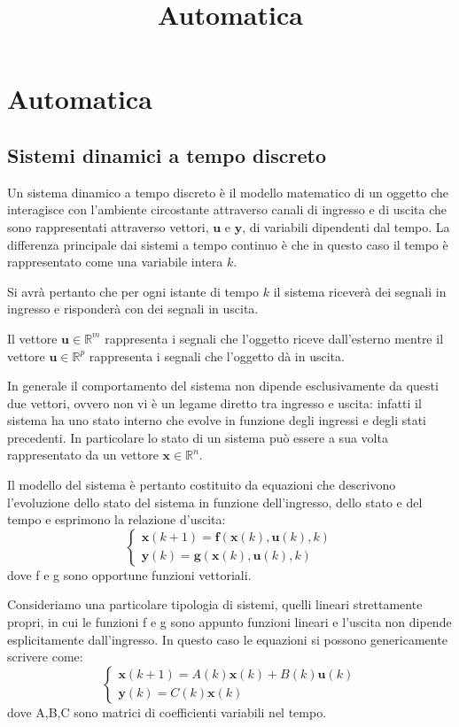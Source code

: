 \documentclass[12pt,a4paper]{article}
\title{Automatica}
\begin{document}
\section{Automatica}
\subsection{Sistemi dinamici a tempo discreto}

Un sistema dinamico a tempo discreto è il modello matematico di un oggetto che interagisce con l’ambiente circostante attraverso canali di ingresso e di uscita che sono rappresentati attraverso vettori, $\mathbf{u}$ e $\mathbf{y}$, di variabili dipendenti dal tempo. La differenza principale dai sistemi a tempo continuo è che in questo caso il tempo è rappresentato come una variabile intera $k$.

Si avrà pertanto che per ogni istante di tempo $k$ il sistema riceverà dei segnali in ingresso e risponderà con dei segnali in uscita.

Il vettore $\mathbf{u} \in \mathbb{R}^m$ rappresenta i segnali che l’oggetto riceve dall’esterno mentre il vettore $\mathbf{u} \in \mathbb{R}^p$ rappresenta i segnali che l’oggetto dà in uscita.


In generale il comportamento del sistema non dipende esclusivamente da questi due vettori, ovvero non vi è un legame diretto tra ingresso e uscita: infatti il sistema ha uno stato interno che evolve in funzione degli ingressi e degli stati precedenti. In particolare lo stato di un sistema può essere a sua volta rappresentato da un vettore $\mathbf{x} \in \mathbb{R}^n$.


Il modello del sistema è pertanto costituito da equazioni che descrivono l’evoluzione dello stato del sistema in funzione dell’ingresso, dello stato e del tempo e esprimono la relazione d'uscita:
\[
\begin{cases}
\mathbf{x}(k+1) = \mathbf{f}(\mathbf{x}(k),\mathbf{u}(k),k) \\
\mathbf{y}(k) = \mathbf{g}(\mathbf{x}(k),\mathbf{u}(k),k)
\end{cases}
\]
dove f e g sono opportune funzioni vettoriali.

Consideriamo una particolare tipologia di sistemi, quelli lineari strettamente propri, in cui le funzioni f e g sono appunto funzioni lineari e l’uscita non dipende esplicitamente dall’ingresso. In questo caso le equazioni si possono genericamente scrivere come:
\[
\begin{cases}
\mathbf{x}(k+1) = A(k)\mathbf{x}(k) + B(k)\mathbf{u}(k) \\
\mathbf{y}(k) = C(k)\mathbf{x}(k)
\end{cases}
\]
dove A,B,C sono matrici di coefficienti variabili nel tempo.
\end{document}
